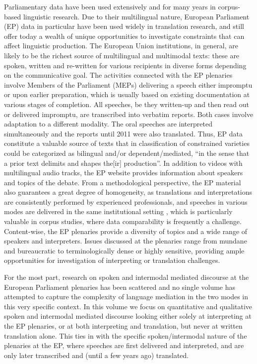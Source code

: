 \documentclass[output=paper]{langscibook}
\begin{document}
Parliamentary data have been used extensively and for many years in corpus-based linguistic research.  Due to their multilingual nature, European Parliament (EP) data \citep{Tiedemann2012} in particular have been used widely in translation research, and still offer today a wealth of unique opportunities to investigate constraints that can affect linguistic production. The European Union institutions, in general, are likely to be the richest source of multilingual and multimodal texts: these are spoken, written and re-written for various recipients in diverse forms depending on the communicative goal. The activities connected with the EP plenaries involve Members of the Parliament (MEPs) delivering a speech either impromptu or upon earlier preparation, which is usually based on existing documentation at various stages of completion. All speeches, be they written-up and then read out or delivered impromptu, are transcribed into verbatim reports. Both cases involve adaptation to a different modality. The oral speeches are interpreted simultaneously and the reports until 2011 were also translated. Thus, EP data constitute a valuable source of texts that in  classification of constrained varieties could be categorized as bilingual and/or dependent/mediated, “in the sense that a prior text delimits and shapes the[ir] production”. In addition to videos with multilingual audio tracks, the EP website provides information about speakers and topics of the debate. From a methodological perspective, the EP material also guarantees a great degree of homogeneity, as translations and interpretations are consistently performed by experienced professionals, and speeches in various modes are delivered in the same institutional setting \citep{MontiEtAl2005}, which is particularly valuable in corpus studies, where data comparability is frequently a challenge. Content-wise, the EP plenaries provide a diversity of topics and a wide range of speakers and interpreters. Issues discussed at the plenaries range from mundane and bureaucratic to terminologically dense or highly sensitive, providing ample opportunities for investigation of interpreting or translation challenges.

For the most part, research on spoken and intermodal mediated discourse at the European Parliament plenaries has been scattered and no single volume has attempted to capture the complexity of language mediation in the two modes in this very specific context. In this volume we focus on quantitative and qualitative spoken and intermodal mediated discourse looking either solely at interpreting at the EP plenaries, or at both interpreting and translation, but never at written translation alone. This ties in with the specific spoken/intermodal nature of the plenaries at the EP, where speeches are first delivered and interpreted, and are only later transcribed and (until a few years ago) translated.
\end{document}
